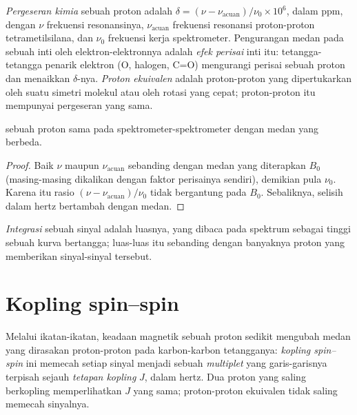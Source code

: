 \begin{definition}\label{def:b1:structure-spectroscopy:chemical-shift}
\emph{Pergeseran kimia} sebuah proton adalah
$\delta = (\nu - \nu_{\text{acuan}})/\nu_0 \times 10^6$, dalam \unit{ppm},
dengan $\nu$ frekuensi resonansinya, $\nu_{\text{acuan}}$ frekuensi
resonansi proton-proton tetrametilsilana, dan $\nu_0$ frekuensi kerja
spektrometer. Pengurangan medan pada sebuah inti oleh elektron-elektronnya
adalah \emph{efek perisai} inti itu: tetangga-tetangga
penarik elektron (O, halogen, C=O) mengurangi perisai sebuah proton dan
menaikkan $\delta$-nya. \emph{Proton ekuivalen}
adalah proton-proton yang dipertukarkan oleh suatu simetri molekul atau
oleh rotasi yang cepat; proton-proton itu mempunyai pergeseran yang
sama.
\end{definition}

\begin{proposition}\label{prop:b1:structure-spectroscopy:shift-field-independent}
 sebuah proton sama pada spektrometer-spektrometer
dengan medan yang berbeda.
\end{proposition}

\begin{proof}
Baik $\nu$ maupun $\nu_{\text{acuan}}$ sebanding dengan medan yang
diterapkan $B_0$ (masing-masing dikalikan dengan faktor perisainya
sendiri), demikian pula $\nu_0$. Karena itu rasio
$(\nu - \nu_{\text{acuan}})/\nu_0$ tidak bergantung pada $B_0$.
Sebaliknya, selisih dalam hertz bertambah dengan medan.
\end{proof}

\begin{definition}[Integrasi]\label{def:b1:structure-spectroscopy:integration}
\emph{Integrasi} sebuah sinyal adalah luasnya, yang
dibaca pada spektrum sebagai tinggi sebuah kurva bertangga; luas-luas
itu sebanding dengan banyaknya proton yang memberikan sinyal-sinyal
tersebut.
\end{definition}

\section{Kopling spin--spin}

\begin{definition}\label{def:b1:structure-spectroscopy:coupling}
Melalui ikatan-ikatan, keadaan magnetik sebuah proton sedikit mengubah
medan yang dirasakan proton-proton pada karbon-karbon tetangganya:
\emph{kopling spin--spin} ini memecah setiap
sinyal menjadi sebuah \emph{multiplet} yang
garis-garisnya terpisah sejauh
\emph{tetapan kopling} $J$, dalam hertz. Dua proton yang saling berkopling
memperlihatkan $J$ yang sama; proton-proton ekuivalen tidak saling
memecah sinyalnya.
\end{definition}

